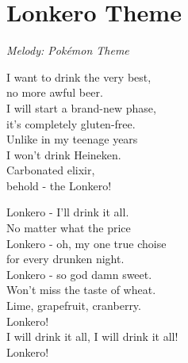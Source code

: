 \section{Lonkero Theme}

\textit{Melody: Pokémon Theme}

I want to drink the very best,\\
no more awful beer.\\
I will start a brand-new phase,\\
it's completely gluten-free.\\
Unlike in my teenage years\\
I won't drink Heineken.\\
Carbonated elixir,\\
behold - the Lonkero!

Lonkero - I'll drink it all.\\
No matter what the price\\
Lonkero - oh, my one true choise\\
for every drunken night.\\
Lonkero - so god damn sweet.\\
Won't miss the taste of wheat.\\
Lime, grapefruit, cranberry.\\
Lonkero!\\
I will drink it all, I will drink it all!\\
Lonkero!